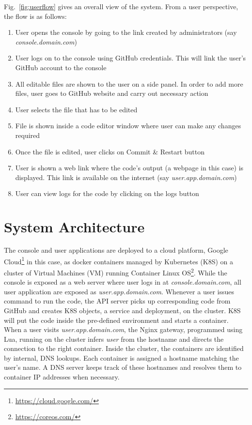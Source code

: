 \documentclass[DD]{iitmdiss}
\begin{document}
Fig.~\ref{fig:userflow} gives an overall view of the system. From a user perspective, the flow is as follows:
\begin{enumerate}
	\item User opens the console by going to the link created by administrators (say \textit{console.domain.com})
	\item User logs on to the console using GitHub credentials. This will link the user's GitHub account to the console
	\item All editable files are shown to the user on a side panel. In order to add more files, user goes to GitHub website and carry out necessary action
	\item User selects the file that has to be edited
	\item File is shown inside a code editor window where user can make any changes required
	\item Once the file is edited, user clicks on Commit \& Restart button
	\item User is shown a web link where the code's output (a webpage in this case) is displayed. This link is available on the internet (say \textit{user.app.domain.com})
	\item User can view logs for the code by clicking on the logs button
	
\end{enumerate}

\section{System Architecture}
The console and user applications are deployed to a cloud platform, Google Cloud\footnote{\url{https://cloud.google.com/}} in this case, as docker containers managed by Kubernetes (K8S) on a cluster of Virtual Machines (VM) running Container Linux OS\footnote{\url{https://coreos.com/}}. While the console is exposed as a web server where user logs in at \textit{console.domain.com}, all user application are exposed as \textit{user.app.domain.com}. Whenever a user issues command to run the code, the API server picks up corresponding code from GitHub and creates K8S objects, a service and deployment, on the cluster. K8S will put the code inside the pre-defined environment and starts a container. When a user visits \textit{user.app.domain.com}, the Nginx gateway, programmed using Lua, running on the cluster infers \textit{user} from the hostname and directs the connection to the right container. Inside the cluster, the containers are identified by internal, DNS lookups. Each container is assigned a hostname matching the user's name. A DNS server keeps track of these hostnames and resolves them to container IP addresses when necessary. 
\end{document}
